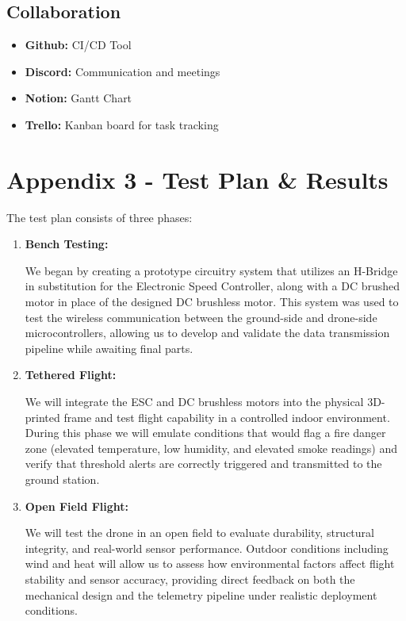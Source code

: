 \documentclass[journal, onecolumn]{IEEEtran}
\begin{document}
\subsection{Collaboration}
\begin{itemize}
    \item \textbf{Github:} CI/CD Tool
    \item \textbf{Discord:} Communication and meetings
    \item \textbf{Notion:} Gantt Chart
    \item \textbf{Trello:} Kanban board for task tracking
\end{itemize}

\newpage

\section{Appendix 3 - Test Plan \& Results}

The test plan consists of three phases:
\begin{enumerate}
    \item \textbf{Bench Testing:}

    We began by creating a prototype circuitry system that utilizes an H-Bridge in substitution for the Electronic Speed Controller, along with a DC brushed motor in place of the designed DC brushless motor. This system was used to test the wireless communication between the ground-side and drone-side microcontrollers, allowing us to develop and validate the data transmission pipeline while awaiting final parts.

    \item \textbf{Tethered Flight:}

    We will integrate the ESC and DC brushless motors into the physical 3D-printed frame and test flight capability in a controlled indoor environment. During this phase we will emulate conditions that would flag a fire danger zone (elevated temperature, low humidity, and elevated smoke readings) and verify that threshold alerts are correctly triggered and transmitted to the ground station.

    \item \textbf{Open Field Flight:}

    We will test the drone in an open field to evaluate durability, structural integrity, and real-world sensor performance. Outdoor conditions including wind and heat will allow us to assess how environmental factors affect flight stability and sensor accuracy, providing direct feedback on both the mechanical design and the telemetry pipeline under realistic deployment conditions.
\end{enumerate}
\end{document}
